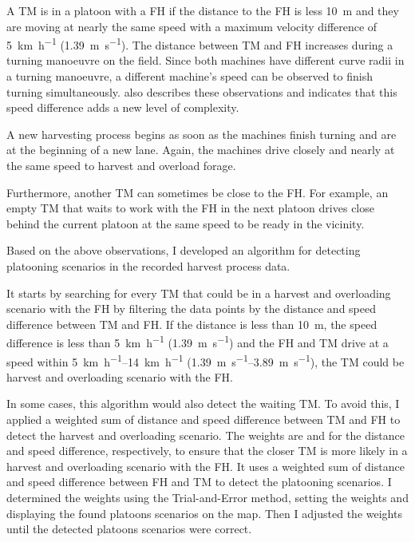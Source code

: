 A \ac{TM} is in a platoon with a \ac{FH} if the distance to the \ac{FH} is less \SI{10}{\metre} and they are moving at
nearly the same speed with a maximum
velocity difference of \SI{5}{\km\per\hour} (\SI{1.39}{\metre\per\second}).
The distance between \ac{TM} and \ac{FH} increases during a turning manoeuvre on the field.
Since both machines have different curve radii in a turning manoeuvre, a different machine's speed can be observed to
finish turning simultaneously.
\textcite{smolnik_5g_2020} also describes these observations and indicates that this speed difference adds a new
level of complexity.

A new harvesting process begins as soon as the machines finish turning and are at the beginning of a new lane.
Again, the machines drive closely and nearly at the same speed to harvest and overload forage.

Furthermore, another \ac{TM} can sometimes be close to the \ac{FH}.
For example, an empty \ac{TM} that waits to work with the \ac{FH} in the next platoon drives close behind the current
platoon at the same speed to be ready in the vicinity.

Based on the above observations, I developed an algorithm for detecting platooning scenarios in the recorded harvest process data.

It starts by searching for every \ac{TM} that could be in a harvest and overloading scenario with the \ac{FH} by filtering
the data points by the distance and speed difference between \ac{TM} and \ac{FH}.
If the distance is less than \SI{10}{\metre}, the speed difference is less than \SI{5}{\km\per\hour}
(\SI{1.39}{\metre\per\second}) and the \ac{FH} and \ac{TM} drive at a speed within \SIrange{5}{14}{\km\per\hour}
(\SIrange{1.39}{3.89}{\metre\per\second}), the \ac{TM} could be harvest and overloading scenario with the \ac{FH}.

In some cases, this algorithm would also detect the waiting \ac{TM}.
To avoid this, I applied a weighted sum of distance and speed difference
between \ac{TM} and \ac{FH} to detect the harvest and overloading scenario.
The weights are  and  for the distance and speed difference, respectively, to ensure that
the closer \ac{TM} is more likely in a harvest and overloading scenario with the \ac{FH}.
It uses a weighted sum of distance and speed difference between \ac{FH} and \ac{TM} to detect the platooning scenarios.
I determined the weights using the Trial-and-Error method, setting the weights and displaying
the found platoons scenarios on the map.
Then I adjusted the weights until the detected platoons scenarios were correct.


